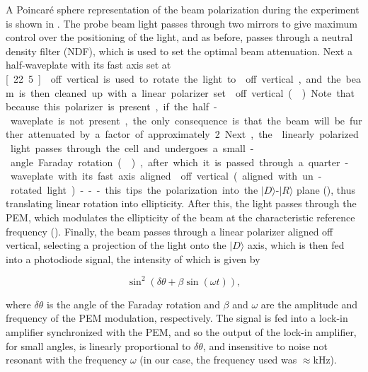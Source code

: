 \documentclass[PaulGanssle-Thesis.tex]{subfiles}
\begin{document}
A Poincar\'{e} sphere representation of the beam polarization during the experiment is shown in . The probe beam light passes through two mirrors to give maximum control over the positioning of the light, and as before, passes through a neutral density filter (NDF), which is used to set the optimal beam attenuation. Next a half-waveplate with its fast axis set at \unit[22.5]{\degsym}  off vertical is used to rotate the light to \unit[45]{\degsym} off vertical, and the beam is then cleaned up with a linear polarizer set \unit[45]{\degsym}  off vertical (). Note that because this polarizer is present, if the half-waveplate is not present, the only consequence is that the beam will be further attenuated by a factor of approximately 2. 

Next, the \unit[45]{\degsym} linearly polarized light passes through the cell and undergoes a small-angle Faraday rotation (), after which it is passed through a quarter-waveplate with its fast axis aligned \unit[45]{\degsym} off vertical (aligned with un-rotated light) --- this tips the polarization into the $|D\rangle$-$|R\rangle$ plane (), thus translating linear rotation into ellipticity. After this, the light passes through the PEM, which modulates the ellipticity of the beam at the characteristic reference frequency (). Finally, the beam passes through a linear polarizer aligned \unit[45]{\degsym} off vertical, selecting a projection of the light onto the $|D\rangle$ axis, which is then fed into a photodiode signal, the intensity of which is given by

\begin{equation}
\sin^{2}\left(\delta\theta + \beta\sin(\omega{}t)\right),
\label{eqn:PEMSignalEquation}
\end{equation}

where $\delta\theta$ is the angle of the Faraday rotation and $\beta$ and $\omega$ are the amplitude and frequency of the PEM modulation, respectively. The signal is fed into a lock-in amplifier synchronized with the PEM, and so the output of the lock-in amplifier, for small angles, is linearly proportional to $\delta\theta$, and insensitive to noise not resonant with the frequency $\omega$ (in our case, the frequency used was $\approx$\unit[50]{kHz}).

\end{document}
